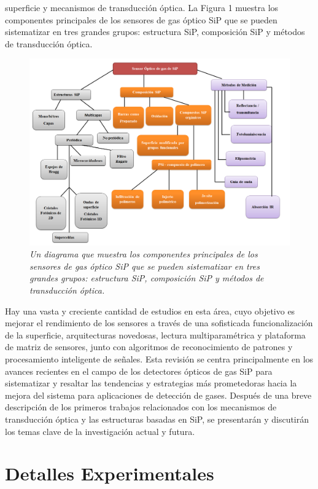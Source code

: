 \documentclass[a4paper,11pt,]{book}
\begin{document}
superficie y mecanismos de transducción óptica. La Figura 1 muestra los componentes principales de los sensores de gas óptico SiP que se pueden sistematizar en tres grandes grupos: estructura SiP, composición SiP y métodos de transducción óptica.
\begin{figure}[H]
	\centering
	\includegraphics[scale=.3]{../Images/SemSip}
	\caption{\emph{ Un diagrama que  muestra los componentes principales de	los sensores de gas óptico SiP que se pueden sistematizar en tres grandes grupos: estructura SiP, composición SiP y métodos de transducción óptica\cite{GAU}. } }
	\label{fig:SemSip1}
\end{figure}

Hay una vasta y creciente cantidad de estudios en esta área, cuyo objetivo es mejorar el rendimiento de los sensores a través de una sofisticada funcionalización de la superficie, arquitecturas novedosas, lectura multiparamétrica y plataforma de matriz de sensores, junto con algoritmos de reconocimiento de patrones y procesamiento inteligente de señales. Esta revisión se centra principalmente en los avances recientes en el campo de los detectores ópticos de gas SiP para sistematizar y resaltar las tendencias y estrategias más prometedoras hacia la mejora del sistema para aplicaciones de detección de gases\cite{GAU}. Después de una breve descripción de los primeros trabajos relacionados con los mecanismos de transducción óptica y las estructuras basadas en SiP, se presentarán y discutirán los temas clave de la investigación actual y futura.
\section{Detalles Experimentales}
\end{document}
